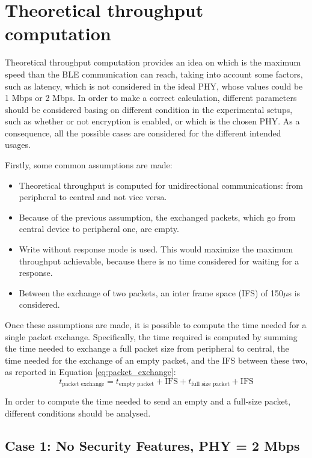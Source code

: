 \documentclass{Configuration_Files/PoliMi3i_thesis}
\begin{document}
\section{Theoretical throughput computation}

Theoretical throughput computation provides an idea on which is the maximum speed than the BLE communication can reach, taking into account some factors, such as latency, which is not considered in the ideal PHY, whose values could be 1 Mbps or 2 Mbps. In order to make a correct calculation, different parameters should be considered basing on different condition in the experimental setups, such as whether or not encryption is enabled, or which is the chosen PHY. As a consequence, all the possible cases are considered for the different intended usages.

Firstly, some common assumptions are made:
\begin{itemize}
    \item Theoretical throughput is computed for unidirectional communications: from peripheral to central and not vice versa.
    \item Because of the previous assumption, the exchanged packets, which go from central device to peripheral one, are empty.
    \item Write without response mode is used. This would maximize the maximum throughput achievable, because there is no time considered for waiting for a response.
    \item Between the exchange of two packets, an inter frame space (IFS) of 150$\mu$s is considered.
\end{itemize}

Once these assumptions are made, it is possible to compute the time needed for a single packet exchange. Specifically, the time required is computed by summing the time needed to exchange a full packet size from peripheral to central, the time needed for the exchange of an empty packet, and the IFS between these two, as reported in Equation \ref{eq:packet_exchange}:
\begin{equation}
t_{\text{packet exchange}} = t_{\text{empty packet}} + \text{IFS} + t_{\text{full size packet}} + \text{IFS}
\label{eq:packet_exchange}
\end{equation}

In order to compute the time needed to send an empty and a full-size packet, different conditions should be analysed.

\subsection*{Case 1: No Security Features, PHY = 2 Mbps}
\end{document}

